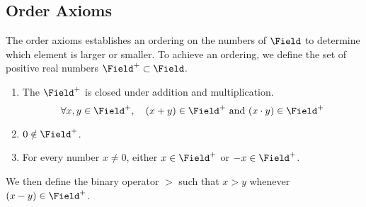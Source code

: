 \subsection{Order Axioms}
The order axioms establishes an ordering on the numbers of \(\Field\) to determine which element is larger or smaller. To achieve an ordering, we define the set of positive real numbers \(\Field^+ \subset \Field\).
\begin{enumerate}[wide,resume,label={Axiom \arabic*.}]
    \item The \(\Field^+\) is closed under addition and multiplication.
          \[\forall x,y \in \Field^+, \quad (x + y) \in \Field^+ \text{ and } (x \cdot y) \in \Field^+\]
    \item \(0 \notin \Field^+\).
    \item For every number \(x \neq 0\), either \(x \in \Field^+\) or \(-x \in \Field^+\).
\end{enumerate}
We then define the binary operator \( > \) such that \(x > y \) whenever \((x - y) \in \Field^+\).
